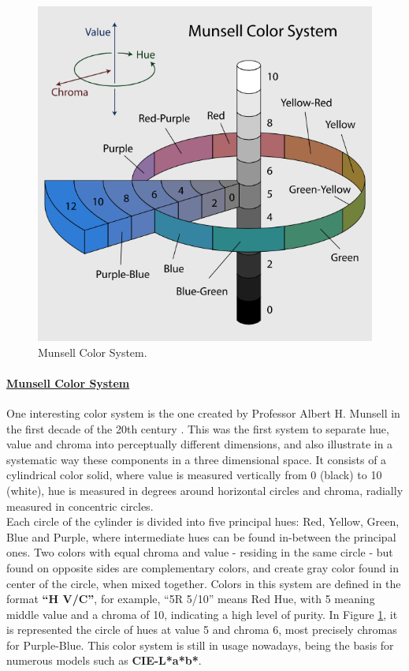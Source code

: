 \begin{figure}
  \centering
  \vspace{-\baselineskip}
  \includegraphics[width=0.9\linewidth]{images/background/MunsellSystem.png}
  \caption[Munsell Color System Representation]{Munsell Color System.\protect\footnotemark{}}
  \label{fig:munsell}
\end{figure}
%
\paragraph{\underline{Munsell Color System}} One interesting color system is the one created by
Professor Albert H. Munsell in the first decade of the 20th century \cite{Munsell1919}. This was the first system to separate
hue, value and chroma into perceptually different dimensions, and also illustrate in a systematic way these
components in a three dimensional space. It consists of a cylindrical color solid, where value is measured
vertically from 0 (black) to 10 (white), hue is measured in degrees around horizontal circles and chroma,
radially measured in concentric circles. \\
Each circle of the cylinder is divided into five principal hues: Red, Yellow, Green, Blue and Purple, where
intermediate hues can be found
in-between the principal ones. Two colors with equal chroma and value - residing in the same circle - but
found on opposite sides are complementary colors, and create gray color found in center of the
circle, when mixed together.  Colors in this system are defined in the format \textbf{“H V/C”}, for example,
“5R 5/10” means Red Hue, with 5 meaning middle value and a chroma of 10, indicating a high level of purity. In Figure \ref{fig:munsell}, it is represented the circle of hues at value 5 and chroma 6, most precisely chromas for Purple-Blue.
This color system is still in usage nowadays, being the basis for numerous models such as \textbf{CIE-L*a*b*}. \par
%
